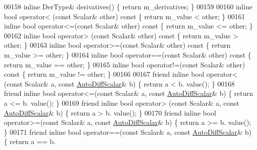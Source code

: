 \begin{DoxyCode}
00158     \textcolor{keyword}{inline} DerType& derivatives() \{ \textcolor{keywordflow}{return} m\_derivatives; \}
00159 
00160     \textcolor{keyword}{inline} \textcolor{keywordtype}{bool} operator< (\textcolor{keyword}{const} Scalar& other)\textcolor{keyword}{ const  }\{ \textcolor{keywordflow}{return} m\_value <  other; \}
00161     \textcolor{keyword}{inline} \textcolor{keywordtype}{bool} operator<=(\textcolor{keyword}{const} Scalar& other)\textcolor{keyword}{ const  }\{ \textcolor{keywordflow}{return} m\_value <= other; \}
00162     \textcolor{keyword}{inline} \textcolor{keywordtype}{bool} operator> (\textcolor{keyword}{const} Scalar& other)\textcolor{keyword}{ const  }\{ \textcolor{keywordflow}{return} m\_value >  other; \}
00163     \textcolor{keyword}{inline} \textcolor{keywordtype}{bool} operator>=(\textcolor{keyword}{const} Scalar& other)\textcolor{keyword}{ const  }\{ \textcolor{keywordflow}{return} m\_value >= other; \}
00164     \textcolor{keyword}{inline} \textcolor{keywordtype}{bool} operator==(\textcolor{keyword}{const} Scalar& other)\textcolor{keyword}{ const  }\{ \textcolor{keywordflow}{return} m\_value == other; \}
00165     \textcolor{keyword}{inline} \textcolor{keywordtype}{bool} operator!=(\textcolor{keyword}{const} Scalar& other)\textcolor{keyword}{ const  }\{ \textcolor{keywordflow}{return} m\_value != other; \}
00166 
00167     \textcolor{keyword}{friend} \textcolor{keyword}{inline} \textcolor{keywordtype}{bool} operator< (\textcolor{keyword}{const} Scalar& a, \textcolor{keyword}{const} \hyperlink{class_eigen_1_1_auto_diff_scalar}{AutoDiffScalar}& b) \{ \textcolor{keywordflow}{return} a <  b.
      value(); \}
00168     \textcolor{keyword}{friend} \textcolor{keyword}{inline} \textcolor{keywordtype}{bool} operator<=(\textcolor{keyword}{const} Scalar& a, \textcolor{keyword}{const} \hyperlink{class_eigen_1_1_auto_diff_scalar}{AutoDiffScalar}& b) \{ \textcolor{keywordflow}{return} a <= b.
      value(); \}
00169     \textcolor{keyword}{friend} \textcolor{keyword}{inline} \textcolor{keywordtype}{bool} operator> (\textcolor{keyword}{const} Scalar& a, \textcolor{keyword}{const} \hyperlink{class_eigen_1_1_auto_diff_scalar}{AutoDiffScalar}& b) \{ \textcolor{keywordflow}{return} a >  b.
      value(); \}
00170     \textcolor{keyword}{friend} \textcolor{keyword}{inline} \textcolor{keywordtype}{bool} operator>=(\textcolor{keyword}{const} Scalar& a, \textcolor{keyword}{const} \hyperlink{class_eigen_1_1_auto_diff_scalar}{AutoDiffScalar}& b) \{ \textcolor{keywordflow}{return} a >= b.
      value(); \}
00171     \textcolor{keyword}{friend} \textcolor{keyword}{inline} \textcolor{keywordtype}{bool} operator==(\textcolor{keyword}{const} Scalar& a, \textcolor{keyword}{const} \hyperlink{class_eigen_1_1_auto_diff_scalar}{AutoDiffScalar}& b) \{ \textcolor{keywordflow}{return} a == b.

\end{DoxyCode}
